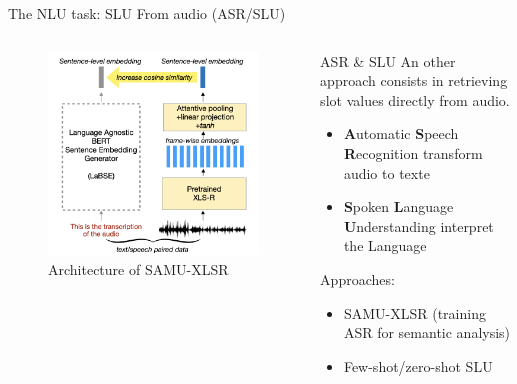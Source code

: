 \documentclass[10pt,aspectratio=169]{beamer}
\begin{document}
\begin{frame}{The NLU task: SLU From audio (ASR/SLU)}
\begin{columns}
    \begin{column}{0.4\textwidth}
        \begin{figure}
            \centering
            \includegraphics[width=1.\textwidth]{media/slu.png}
            \caption{Architecture of SAMU-XLSR \cite{Khurana_2022_samu}}
            \label{fig:samu}
        \end{figure}
    \end{column}
    \begin{column}{0.6\textwidth}
            \begin{block}{ASR \& SLU}
        An other approach consists in retrieving slot values directly from audio. 
        \begin{itemize}
            \item \textbf{A}utomatic \textbf{S}peech \textbf{R}ecognition transform audio to texte
            \item \textbf{S}poken \textbf{L}anguage \textbf{U}nderstanding interpret the Language
        \end{itemize}
    \end{block}
    \begin{block}{Approaches:}
        \begin{itemize}
            \item SAMU-XLSR \cite{Khurana_2022_samu} (training ASR for semantic analysis)
            \item Few-shot/zero-shot SLU \cite{laperriere-2022-semantically} %
        \end{itemize}
    \end{block}
    \end{column}
\end{columns}
\end{frame}
\end{document}
